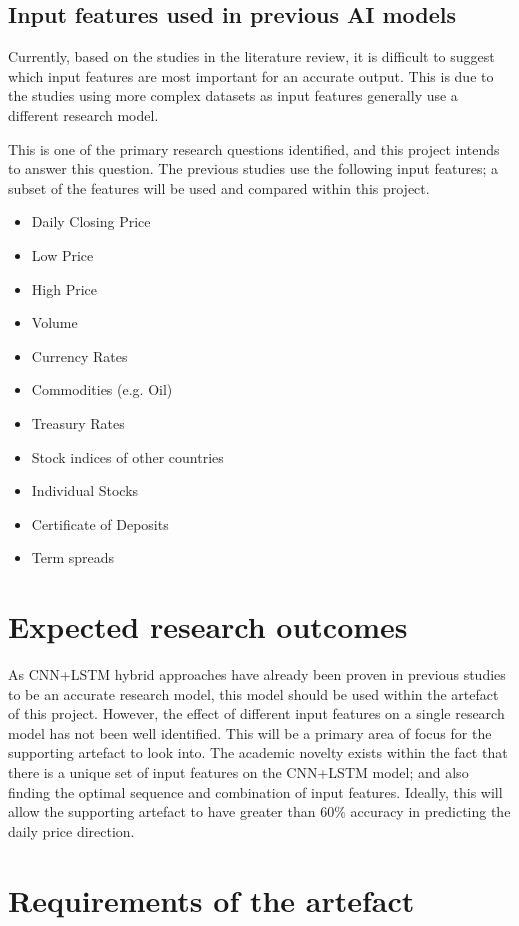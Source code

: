 \subsection{Input features used in previous AI models}
Currently, based on the studies in the literature review, it is difficult to suggest which input features
are most important for an accurate output. This is due to the studies using more complex datasets as input
features generally use a different research model.

This is one of the primary research questions identified, and this project intends to answer this question.
The previous studies use the following input features; a subset of the features will be used and compared
within this project. 
\begin{itemize}
    \item Daily Closing Price
    \item Low Price
    \item High Price
    \item Volume
    \item Currency Rates
    \item Commodities (e.g. Oil)
    \item Treasury Rates
    \item Stock indices of other countries
    \item Individual Stocks
    \item Certificate of Deposits
    \item Term spreads
\end{itemize}

\section{Expected research outcomes}
As CNN+LSTM hybrid approaches have already been proven in previous studies to be an accurate research model,
this model should be used within the artefact of this project. However, the effect of different input
features on a single research model has not been well identified. This will be a primary area of focus for
the supporting artefact to look into. The academic novelty exists within the fact that
there is a unique set of input features on the CNN+LSTM model; and also finding the optimal sequence and
combination of input features. Ideally, this will allow the supporting artefact to have greater than
60\% accuracy in predicting the daily price direction.

\section{Requirements of the artefact}
